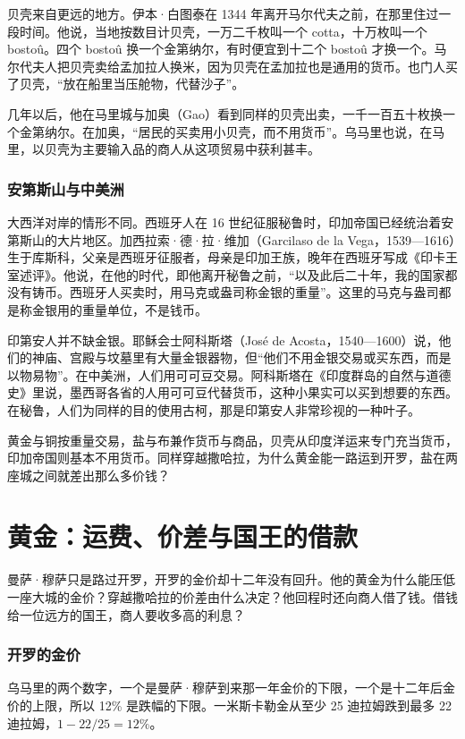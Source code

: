 贝壳来自更远的地方。伊本·白图泰在 1344 年离开马尔代夫之前，在那里住过一段时间。他说，当地按数目计贝壳，一万二千枚叫一个 cotta，十万枚叫一个 bostoû。四个 bostoû 换一个金第纳尔，有时便宜到十二个 bostoû 才换一个\cite{battuta1858}。马尔代夫人把贝壳卖给孟加拉人换米，因为贝壳在孟加拉也是通用的货币。也门人买了贝壳，“放在船里当压舱物，代替沙子”\cite{battuta1858}。

几年以后，他在马里城与加奥（Gao）看到同样的贝壳出卖，一千一百五十枚换一个金第纳尔\cite{battuta1858}。在加奥，“居民的买卖用小贝壳，而不用货币”\cite{battuta1858}。乌马里也说，在马里，以贝壳为主要输入品的商人从这项贸易中获利甚丰\cite{umari1927}。

\subsubsection{安第斯山与中美洲}
大西洋对岸的情形不同。西班牙人在 16 世纪征服秘鲁时，印加帝国已经统治着安第斯山的大片地区。加西拉索·德·拉·维加（Garcilaso de la Vega，1539—1616）生于库斯科，父亲是西班牙征服者，母亲是印加王族，晚年在西班牙写成《印卡王室述评》。他说，在他的时代，即他离开秘鲁之前，“以及此后二十年，我的国家都没有铸币。西班牙人买卖时，用马克或盎司称金银的重量”\cite{garcilaso1869}。这里的马克与盎司都是称金银用的重量单位，不是钱币。

印第安人并不缺金银。耶稣会士阿科斯塔（José de Acosta，1540—1600）说，他们的神庙、宫殿与坟墓里有大量金银器物，但“他们不用金银交易或买东西，而是以物易物”\cite{acosta1880}。在中美洲，人们用可可豆交易。阿科斯塔在《印度群岛的自然与道德史》里说，墨西哥各省的人用可可豆代替货币，这种小果实可以买到想要的东西。在秘鲁，人们为同样的目的使用古柯，那是印第安人非常珍视的一种叶子\cite{acosta1880}。

黄金与铜按重量交易，盐与布兼作货币与商品，贝壳从印度洋运来专门充当货币，印加帝国则基本不用货币。同样穿越撒哈拉，为什么黄金能一路运到开罗，盐在两座城之间就差出那么多价钱？

\section{黄金：运费、价差与国王的借款}\label{sec:africa-gold}

曼萨·穆萨只是路过开罗，开罗的金价却十二年没有回升。他的黄金为什么能压低一座大城的金价？穿越撒哈拉的价差由什么决定？他回程时还向商人借了钱。借钱给一位远方的国王，商人要收多高的利息？

\subsubsection{开罗的金价}
乌马里的两个数字，一个是曼萨·穆萨到来那一年金价的下限，一个是十二年后金价的上限，所以 12\% 是跌幅的下限。一米斯卡勒金从至少 25 迪拉姆跌到最多 22 迪拉姆，$1-22/25=12\%$。

